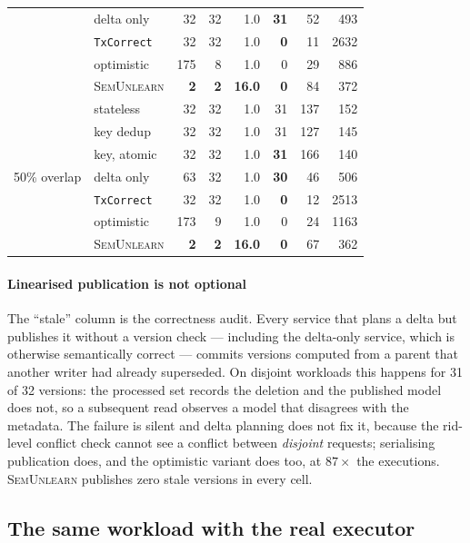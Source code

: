 \documentclass[conference]{IEEEtran}
\newcommand{\sys}{\textsc{SemUnlearn}}
\begin{document}
\begin{table}[t]
{\begin{tabular}{llrrrrrr}
 & delta only & 32 & 32 & 1.0 & \textbf{31} & 52 & 493 \\
 & \texttt{TxCorrect} & 32 & 32 & 1.0 & \textbf{0} & 11 & 2632 \\
 & optimistic & 175 & 8 & 1.0 & 0 & 29 & 886 \\
 & \sys{} & \textbf{2} & \textbf{2} & \textbf{16.0} & \textbf{0} & 84 & 372 \\
\midrule
\multirow{7}{*}{50\% overlap} & stateless & 32 & 32 & 1.0 & 31 & 137 & 152 \\
 & key dedup & 32 & 32 & 1.0 & 31 & 127 & 145 \\
 & key, atomic & 32 & 32 & 1.0 & \textbf{31} & 166 & 140 \\
 & delta only & 63 & 32 & 1.0 & \textbf{30} & 46 & 506 \\
 & \texttt{TxCorrect} & 32 & 32 & 1.0 & \textbf{0} & 12 & 2513 \\
 & optimistic & 173 & 9 & 1.0 & 0 & 24 & 1163 \\
 & \sys{} & \textbf{2} & \textbf{2} & \textbf{16.0} & \textbf{0} & 67 & 362 \\
\bottomrule
\end{tabular}}
\end{table}

\paragraph{Linearised publication is not optional}
The ``stale'' column is the correctness audit.  Every service that plans a delta but
publishes it without a version check --- including the delta-only service, which is
otherwise semantically correct --- commits versions computed from a parent that another
writer had already superseded.  On disjoint workloads this happens for 31 of 32
versions: the processed set records the deletion and the published model does not, so a
subsequent read observes a model that disagrees with the metadata.  The failure is
silent and delta planning does not fix it, because the rid-level conflict check cannot
see a conflict between \emph{disjoint} requests; serialising publication does, and the
optimistic variant does too, at $87\times$ the executions.  \sys{} publishes zero
stale versions in every cell.

\subsection{The same workload with the real executor}
\label{sec:eval-realconc}
\end{document}
